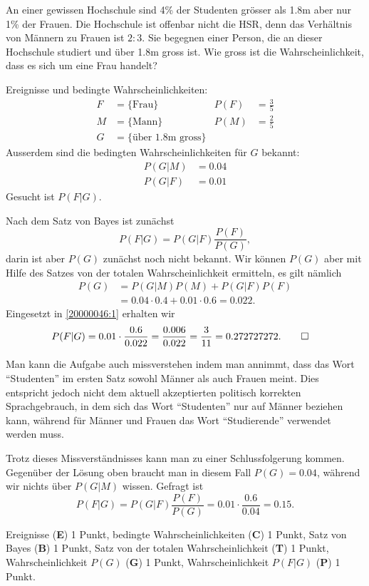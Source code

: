 An einer gewissen Hochschule sind 4\% der Studenten grösser als 1.8m
aber nur 1\% der Frauen.
Die Hochschule ist offenbar nicht die HSR, denn das Verhältnis von
Männern zu Frauen ist $2:3$.
Sie begegnen einer Person, die an dieser Hochschule studiert und über
1.8m gross ist.
Wie gross ist die Wahrscheinlichkeit, dass es sich um eine Frau handelt?


\begin{loesung}
Ereignisse und bedingte Wahrscheinlichkeiten:
\begin{align*}
F&=\{\text{Frau}\}&P(F)&=\frac{3}{5}\\
M&=\{\text{Mann}\}&P(M)&=\frac{2}{5}\\
G&=\{\text{über 1.8m gross}\}&&
\end{align*}
Ausserdem sind die bedingten Wahrscheinlichkeiten für $G$ bekannt:
\begin{align*}
P(G|M)&= 0.04\\
P(G|F)&= 0.01
\end{align*}
Gesucht ist $P(F|G)$.

Nach dem Satz von Bayes ist zunächst
\begin{equation}
P(F|G)
=
P(G|F)\frac{P(F)}{P(G)},
\label{20000046:1}
\end{equation}
darin ist aber $P(G)$ zunächst noch nicht bekannt.
Wir können $P(G)$ aber mit Hilfe des Satzes von der totalen Wahrscheinlichkeit
ermitteln, es gilt nämlich
\begin{align*}
P(G)
&=
P(G|M)P(M) + P(G|F)P(F)
\\
&=
0.04\cdot 0.4+0.01\cdot0.6=0.022.
\end{align*}
Eingesetzt in \eqref{20000046:1} erhalten wir
\begin{align*}
P(F|G)
&=0.01\cdot\frac{0.6}{0.022}
=
\frac{0.006}{0.022}
=
\frac{3}{11}
=
0.272727272.
\qedhere
\end{align*}
\end{loesung}

\begin{diskussion}
Man kann die Aufgabe auch missverstehen indem man annimmt, dass 
das Wort ``Studenten'' im ersten Satz sowohl Männer als auch Frauen 
meint.
Dies entspricht jedoch nicht dem aktuell akzeptierten politisch
korrekten Sprachgebrauch, in dem sich das Wort ``Studenten'' nur
auf Männer beziehen kann, während für Männer und Frauen das Wort
``Studierende'' verwendet werden muss.

Trotz dieses Missverständnisses kann man zu einer Schlussfolgerung kommen.
Gegenüber der Lösung oben braucht man in diesem Fall
$P(G)=0.04$, während wir nichts über $P(G|M)$ wissen.
Gefragt ist
\[
P(F|G)
=
P(G|F)\frac{P(F)}{P(G)}
=
0.01\cdot
\frac{0.6}{0.04}
=
0.15.
\]
\end{diskussion}

\begin{bewertung}
Ereignisse ({\bf E}) 1 Punkt,
bedingte Wahrscheinlichkeiten ({\bf C}) 1 Punkt,
Satz von Bayes ({\bf B}) 1 Punkt,
Satz von der totalen Wahrscheinlichkeit ({\bf T}) 1 Punkt,
Wahrscheinlichkeit $P(G)$ ({\bf G}) 1 Punkt,
Wahrscheinlichkeit $P(F|G)$ ({\bf P}) 1 Punkt.
\end{bewertung}
